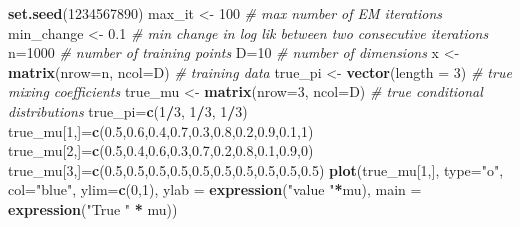 \documentclass[
]{article}
\newenvironment{Shaded}{\begin{snugshade}}{\end{snugshade}}
\newcommand{\AttributeTok}[1]{\textcolor[rgb]{0.13,0.29,0.53}{#1}}
\newcommand{\CommentTok}[1]{\textcolor[rgb]{0.56,0.35,0.01}{\textit{#1}}}
\newcommand{\DecValTok}[1]{\textcolor[rgb]{0.00,0.00,0.81}{#1}}
\newcommand{\FloatTok}[1]{\textcolor[rgb]{0.00,0.00,0.81}{#1}}
\newcommand{\FunctionTok}[1]{\textcolor[rgb]{0.13,0.29,0.53}{\textbf{#1}}}
\newcommand{\NormalTok}[1]{#1}
\newcommand{\OtherTok}[1]{\textcolor[rgb]{0.56,0.35,0.01}{#1}}
\newcommand{\SpecialCharTok}[1]{\textcolor[rgb]{0.81,0.36,0.00}{\textbf{#1}}}
\newcommand{\StringTok}[1]{\textcolor[rgb]{0.31,0.60,0.02}{#1}}
\begin{document}
\begin{Shaded}
\begin{Highlighting}[]
\FunctionTok{set.seed}\NormalTok{(}\DecValTok{1234567890}\NormalTok{)}
\NormalTok{max\_it }\OtherTok{\textless{}{-}} \DecValTok{100} \CommentTok{\# max number of EM iterations}
\NormalTok{min\_change }\OtherTok{\textless{}{-}} \FloatTok{0.1} \CommentTok{\# min change in log lik between two consecutive iterations}
\NormalTok{n}\OtherTok{=}\DecValTok{1000} \CommentTok{\# number of training points}
\NormalTok{D}\OtherTok{=}\DecValTok{10} \CommentTok{\# number of dimensions}
\NormalTok{x }\OtherTok{\textless{}{-}} \FunctionTok{matrix}\NormalTok{(}\AttributeTok{nrow=}\NormalTok{n, }\AttributeTok{ncol=}\NormalTok{D) }\CommentTok{\# training data}
\NormalTok{true\_pi }\OtherTok{\textless{}{-}} \FunctionTok{vector}\NormalTok{(}\AttributeTok{length =} \DecValTok{3}\NormalTok{) }\CommentTok{\# true mixing coefficients}
\NormalTok{true\_mu }\OtherTok{\textless{}{-}} \FunctionTok{matrix}\NormalTok{(}\AttributeTok{nrow=}\DecValTok{3}\NormalTok{, }\AttributeTok{ncol=}\NormalTok{D) }\CommentTok{\# true conditional distributions}
\NormalTok{true\_pi}\OtherTok{=}\FunctionTok{c}\NormalTok{(}\DecValTok{1}\SpecialCharTok{/}\DecValTok{3}\NormalTok{, }\DecValTok{1}\SpecialCharTok{/}\DecValTok{3}\NormalTok{, }\DecValTok{1}\SpecialCharTok{/}\DecValTok{3}\NormalTok{)}
\NormalTok{true\_mu[}\DecValTok{1}\NormalTok{,]}\OtherTok{=}\FunctionTok{c}\NormalTok{(}\FloatTok{0.5}\NormalTok{,}\FloatTok{0.6}\NormalTok{,}\FloatTok{0.4}\NormalTok{,}\FloatTok{0.7}\NormalTok{,}\FloatTok{0.3}\NormalTok{,}\FloatTok{0.8}\NormalTok{,}\FloatTok{0.2}\NormalTok{,}\FloatTok{0.9}\NormalTok{,}\FloatTok{0.1}\NormalTok{,}\DecValTok{1}\NormalTok{)}
\NormalTok{true\_mu[}\DecValTok{2}\NormalTok{,]}\OtherTok{=}\FunctionTok{c}\NormalTok{(}\FloatTok{0.5}\NormalTok{,}\FloatTok{0.4}\NormalTok{,}\FloatTok{0.6}\NormalTok{,}\FloatTok{0.3}\NormalTok{,}\FloatTok{0.7}\NormalTok{,}\FloatTok{0.2}\NormalTok{,}\FloatTok{0.8}\NormalTok{,}\FloatTok{0.1}\NormalTok{,}\FloatTok{0.9}\NormalTok{,}\DecValTok{0}\NormalTok{)}
\NormalTok{true\_mu[}\DecValTok{3}\NormalTok{,]}\OtherTok{=}\FunctionTok{c}\NormalTok{(}\FloatTok{0.5}\NormalTok{,}\FloatTok{0.5}\NormalTok{,}\FloatTok{0.5}\NormalTok{,}\FloatTok{0.5}\NormalTok{,}\FloatTok{0.5}\NormalTok{,}\FloatTok{0.5}\NormalTok{,}\FloatTok{0.5}\NormalTok{,}\FloatTok{0.5}\NormalTok{,}\FloatTok{0.5}\NormalTok{,}\FloatTok{0.5}\NormalTok{)}
\FunctionTok{plot}\NormalTok{(true\_mu[}\DecValTok{1}\NormalTok{,], }\AttributeTok{type=}\StringTok{"o"}\NormalTok{, }\AttributeTok{col=}\StringTok{"blue"}\NormalTok{, }\AttributeTok{ylim=}\FunctionTok{c}\NormalTok{(}\DecValTok{0}\NormalTok{,}\DecValTok{1}\NormalTok{), }\AttributeTok{ylab =} \FunctionTok{expression}\NormalTok{(}\StringTok{"value "}\SpecialCharTok{*}\NormalTok{mu), }\AttributeTok{main =} \FunctionTok{expression}\NormalTok{(}\StringTok{"True "} \SpecialCharTok{*}\NormalTok{ mu))}

\end{Highlighting}
\end{Shaded}
\end{document}

